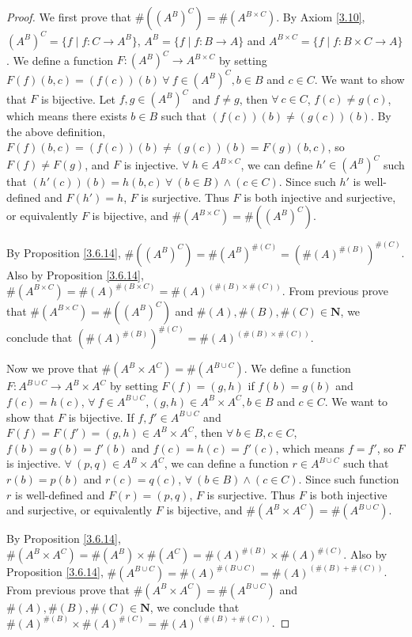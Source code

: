 \begin{proof}
    We first prove that \(\#((A^B)^C) = \#(A^{B \times C})\).
    By Axiom \ref{3.10}, \((A^B)^C = \{f \mid f : C \to A^B\}\), \(A^B = \{f \mid f : B \to A\}\) and \(A^{B \times C} = \{f \mid f : B \times C \to A\}\).
    We define a function \(F : (A^B)^C \to A^{B \times C}\) by setting \(F(f)(b, c) = (f(c))(b) \ \forall\ f \in (A^B)^C, b \in B\) and \(c \in C\).
    We want to show that \(F\) is bijective.
    Let \(f, g \in (A^B)^C\) and \(f \neq g\), then \(\forall\ c \in C\), \(f(c) \neq g(c)\), which means there exists \(b \in B\) such that \((f(c))(b) \neq (g(c))(b)\).
    By the above definition, \(F(f)(b, c) = (f(c))(b) \neq (g(c))(b) = F(g)(b, c)\), so \(F(f) \neq F(g)\), and \(F\) is injective.
    \(\forall\ h \in A^{B \times C}\), we can define \(h' \in (A^B)^C\) such that \((h'(c))(b) = h(b, c) \ \forall\ (b \in B) \land (c \in C)\).
    Since such \(h'\) is well-defined and \(F(h') = h\), \(F\) is surjective.
    Thus \(F\) is both injective and surjective, or equivalently \(F\) is bijective, and \(\#(A^{B \times C}) = \#((A^B)^C)\).

    By Proposition \ref{3.6.14}, \(\#((A^B)^C) = \#(A^B)^{\#(C)} = (\#(A)^{\#(B)})^{\#(C)}\).
    Also by Proposition \ref{3.6.14}, \(\#(A^{B \times C}) = \#(A)^{\#(B \times C)} = \#(A)^{(\#(B) \times \#(C))}\).
    From previous prove that \(\#(A^{B \times C}) = \#((A^B)^C)\) and \(\#(A), \#(B), \#(C) \in \mathbf{N}\), we conclude that \((\#(A)^{\#(B)})^{\#(C)} = \#(A)^{(\#(B) \times \#(C))}\).

    Now we prove that \(\#(A^B \times A^C) = \#(A^{B \cup C})\).
    We define a function \(F : A^{B \cup C} \to A^B \times A^C\) by setting \(F(f) = (g, h)\) if \(f(b) = g(b)\) and \(f(c) = h(c)\), \(\forall\ f \in A^{B \cup C}, (g, h) \in A^B \times A^C, b \in B\) and \(c \in C\).
    We want to show that \(F\) is bijective.
    If \(f, f' \in A^{B \cup C}\) and \(F(f) = F(f') = (g, h) \in A^B \times A^C\), then \(\forall\ b \in B, c \in C\), \(f(b) = g(b) = f'(b)\) and \(f(c) = h(c) = f'(c)\), which means \(f = f'\), so \(F\) is injective.
    \(\forall\ (p, q) \in A^B \times A^C\), we can define a function \(r \in A^{B \cup C}\) such that \(r(b) = p(b)\) and \(r(c) = q(c)\), \(\forall\ (b \in B) \land (c \in C)\).
    Since such function \(r\) is well-defined and \(F(r) = (p, q)\), \(F\) is surjective.
    Thus \(F\) is both injective and surjective, or equivalently \(F\) is bijective, and \(\#(A^B \times A^C) = \#(A^{B \cup C})\).

    By Proposition \ref{3.6.14}, \(\#(A^B \times A^C) = \#(A^B) \times \#(A^C) = \#(A)^{\#(B)} \times \#(A)^{\#(C)}\).
    Also by Proposition \ref{3.6.14}, \(\#(A^{B \cup C}) = \#(A)^{\#(B \cup C)} = \#(A)^{(\#(B) + \#(C))}\).
    From previous prove that \(\#(A^B \times A^C) = \#(A^{B \cup C})\) and \(\#(A), \#(B), \#(C) \in \mathbf{N}\), we conclude that \(\#(A)^{\#(B)} \times \#(A)^{\#(C)} = \#(A)^{(\#(B) + \#(C))}\).
\end{proof}

